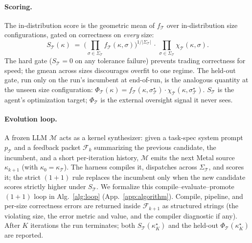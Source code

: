 \documentclass{article}
\theoremstyle{plain}
\theoremstyle{definition}
\theoremstyle{remark}
\begin{document}
\paragraph{Scoring.} The in-distribution score is the geometric mean of
$f_{\mathcal{T}}$ over in-distribution size configurations, gated on correctness on \emph{every}
size:
\begin{equation*}
S_{\mathcal{T}}(\kappa) \;=\;
\Big(\textstyle\prod_{\sigma\in\Sigma_{\mathcal{T}}} f_{\mathcal{T}}(\kappa,\sigma)\Big)^{1/|\Sigma_{\mathcal{T}}|}
\,\cdot\,
\textstyle\prod_{\sigma\in\Sigma_{\mathcal{T}}}\chi_{\mathcal{T}}(\kappa,\sigma).
\end{equation*}
The hard gate ($S_{\mathcal{T}}{=}0$ on any tolerance failure) prevents
trading correctness for speed; the gmean across sizes discourages overfit
to one regime. The held-out gate, run only on the run's incumbent at
end-of-run, is the analogous quantity at the unseen size configuration:
$\Phi_{\mathcal{T}}(\kappa){=}f_{\mathcal{T}}(\kappa,\sigma^{\star}_{\mathcal{T}}){\cdot}\chi_{\mathcal{T}}(\kappa,\sigma^{\star}_{\mathcal{T}})$.
$S_{\mathcal{T}}$ is the agent's optimization target; $\Phi_{\mathcal{T}}$
is the external oversight signal it never sees.

\paragraph{Evolution loop.} A frozen LLM $\mathcal{M}$ acts as a kernel
synthesizer: given a task-spec system prompt $p_{\mathcal{T}}$ and a
feedback packet $\mathcal{F}_k$ summarizing the previous candidate, the
incumbent, and a short per-iteration history, $\mathcal{M}$ emits the
next Metal source $\kappa_{k+1}$ (with
$\kappa_0{=}\kappa_{\mathcal{T}}$). The harness compiles it, dispatches
across $\Sigma_{\mathcal{T}}$, and scores it; the strict $(1{+}1)$ rule
replaces the incumbent only when the new candidate scores strictly
higher under $S_{\mathcal{T}}$. We formalize this
compile--evaluate--promote $(1{+}1)$ loop in
Alg.~\ref{alg:loop} (App.~\ref{app:algorithm}). Compile, pipeline,
and per-size correctness errors are returned inside $\mathcal{F}_{k+1}$ as
structured strings (the violating size, the error metric and value, and
the compiler diagnostic if any). After $K$ iterations the run terminates;
both $S_{\mathcal{T}}(\kappa^{\star}_K)$ and the held-out
$\Phi_{\mathcal{T}}(\kappa^{\star}_K)$ are reported. %
\end{document}
